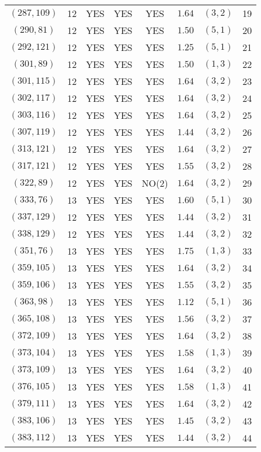 \begin{longtable}{|c|c|c|c|c|c|c|c|}
$(287,109)$ & 12 & YES & YES & YES & $1.64$ & $(3,2)$ & 19\\
$(290,81)$ & 12 & YES & YES & YES & $1.50$ & $(5,1)$ & 20\\
$(292,121)$ & 12 & YES & YES & YES & $1.25$ & $(5,1)$ & 21\\
$(301,89)$ & 12 & YES & YES & YES & $1.50$ & $(1,3)$ & 22\\
$(301,115)$ & 12 & YES & YES & YES & $1.64$ & $(3,2)$ & 23\\
$(302,117)$ & 12 & YES & YES & YES & $1.64$ & $(3,2)$ & 24\\
$(303,116)$ & 12 & YES & YES & YES & $1.64$ & $(3,2)$ & 25\\
$(307,119)$ & 12 & YES & YES & YES & $1.44$ & $(3,2)$ & 26\\
$(313,121)$ & 12 & YES & YES & YES & $1.64$ & $(3,2)$ & 27\\
$(317,121)$ & 12 & YES & YES & YES & $1.55$ & $(3,2)$ & 28\\
$(322,89)$ & 12 & YES & YES & NO(2) & $1.64$ & $(3,2)$ & 29\\
$(333,76)$ & 13 & YES & YES & YES & $1.60$ & $(5,1)$ & 30\\
$(337,129)$ & 12 & YES & YES & YES & $1.44$ & $(3,2)$ & 31\\
$(338,129)$ & 12 & YES & YES & YES & $1.44$ & $(3,2)$ & 32\\
$(351,76)$ & 13 & YES & YES & YES & $1.75$ & $(1,3)$ & 33\\
$(359,105)$ & 13 & YES & YES & YES & $1.64$ & $(3,2)$ & 34\\
$(359,106)$ & 13 & YES & YES & YES & $1.55$ & $(3,2)$ & 35\\
$(363,98)$ & 13 & YES & YES & YES & $1.12$ & $(5,1)$ & 36\\
$(365,108)$ & 13 & YES & YES & YES & $1.56$ & $(3,2)$ & 37\\
$(372,109)$ & 13 & YES & YES & YES & $1.64$ & $(3,2)$ & 38\\
$(373,104)$ & 13 & YES & YES & YES & $1.58$ & $(1,3)$ & 39\\
$(373,109)$ & 13 & YES & YES & YES & $1.64$ & $(3,2)$ & 40\\
$(376,105)$ & 13 & YES & YES & YES & $1.58$ & $(1,3)$ & 41\\
$(379,111)$ & 13 & YES & YES & YES & $1.64$ & $(3,2)$ & 42\\
$(383,106)$ & 13 & YES & YES & YES & $1.45$ & $(3,2)$ & 43\\
$(383,112)$ & 13 & YES & YES & YES & $1.44$ & $(3,2)$ & 44\\

\end{longtable}

